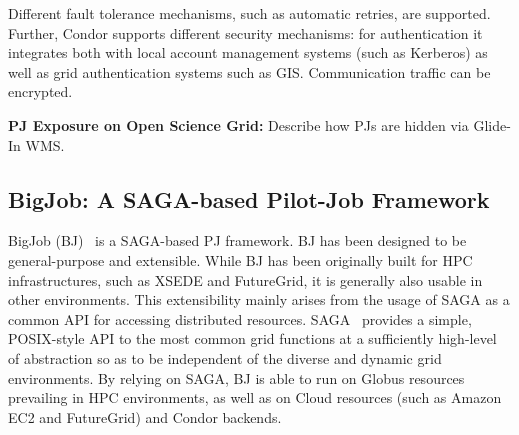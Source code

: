 \documentclass[conference,final]{IEEEtran}
\newcommand{\terminology}[1]{ {\textcolor{red} {(Terminology used: \textbf{#1}) }}}
\newcommand{\jhanote}[1]{ {\textcolor{red} { ***shantenu: #1 }}}
\newcommand{\alnote}[1]{ {\textcolor{blue} { ***andrel: #1 }}}
\newcommand{\terminology}[1]{}
\newcommand{\alnote}[1]{}
\newcommand{\jhanote}[1]{}
\newcommand{\upp}{\vspace*{-0.5em}}
\begin{document}
Different fault tolerance mechanisms, such as automatic retries, are
supported.  Further, Condor supports different security mechanisms:
for authentication it integrates both with local account management
systems (such as Kerberos) as well as grid authentication systems such
as GIS. Communication traffic can be encrypted.

\noindent \textbf{PJ Exposure on Open Science Grid:} Describe 
how PJs are hidden via Glide-In WMS.


\subsection{BigJob: A SAGA-based Pilot-Job Framework\upp\upp}
\label{sec:bigjob_description}










BigJob (BJ)~\cite{bigjob_web,saga_bigjob_condor_cloud} is a SAGA-based PJ
framework. BJ has been designed to be general-purpose and extensible. While BJ
has been originally built for HPC infrastructures, such as XSEDE and FutureGrid,
it is generally also usable in other environments. This extensibility mainly
arises from the usage of SAGA as a common API for accessing distributed
resources. SAGA~\cite{saga_url,ogf-gfd-90} provides a simple, POSIX-style API to
the most common grid functions at a sufficiently high-level of abstraction so as
to be independent of the diverse and dynamic grid environments.
By relying on SAGA, BJ is able to run on Globus resources prevailing in HPC
environments, as well as on Cloud resources (such as Amazon EC2 and FutureGrid)
and Condor backends.
\end{document}
